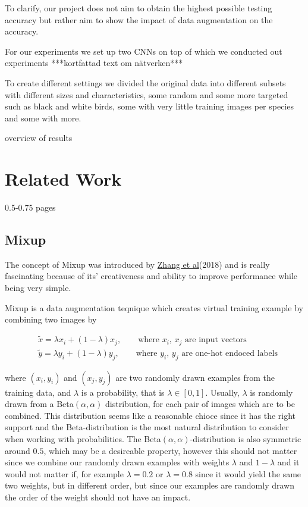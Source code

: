 \documentclass{article}
\begin{document}
To clarify, our project does not aim to obtain the highest possible testing accuracy but rather aim to show the impact of data augmentation 
on the accuracy. 

For our experiments we set up two CNNs on top of which we conducted out experiments ***kortfattad text om nätverken***

To create different settings we divided the original data into different subsets with different sizes and characteristics, some random and some more targeted such as black and white birds, some with very little training images per species and some with more.

overview of results

\section{Related Work}

0.5-0.75 pages

\subsection{Mixup}
The concept of Mixup was introduced by \href{https://arxiv.org/pdf/1710.09412.pdf}{Zhang et al}(2018) and is really fascinating because of its' creativeness and ability to improve performance while being very simple. 

Mixup is a data augmentation teqnique which creates virtual training example by combining two images by 

\begin{align*}
&\tilde{x} = \lambda x_i + (1-\lambda) x_j, \qquad \text{where $x_i$, $x_j$ are input vectors} \\
&\tilde{y} = \lambda y_i + (1-\lambda) y_j, \qquad \text{where $y_i$, $y_j$ are one-hot endoced labels}
\end{align*}


where $(x_i, y_i)$ and $(x_j, y_j)$ are two randomly drawn examples from the training data, and $\lambda$ 
is a probability, that is $\lambda \in [0,1]$. Usually, $\lambda$ is randomly drawn from a Beta$(\alpha, \alpha)$ 
distribution, for each pair of images which are to be combined. This distribution seems like a 
reasonable chioce since it has the right support and the Beta-distribution is the most natural distribution to
consider when working with probabilities. The Beta$(\alpha, \alpha)$-distribution is also symmetric around $0.5$, which may be 
a desireable property, however this should not matter since we combine our randomly drawn examples with weights $\lambda$ and $1-\lambda$ and 
it would not matter if, for example $\lambda = 0.2$ or $\lambda = 0.8$ since it would yield the same two weights, but in different order, but 
since our examples are randomly drawn the order of the weight should not have an impact. 
\end{document}
